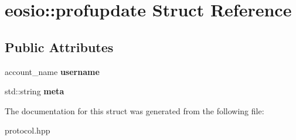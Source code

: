 \hypertarget{structeosio_1_1profupdate}{}\section{eosio\+:\+:profupdate Struct Reference}
\label{structeosio_1_1profupdate}
\subsection*{Public Attributes}
\begin{DoxyCompactItemize}
\item 
\mbox{\label{structeosio_1_1profupdate_a0fcb866e1dd8e75c866fd5ae4129f388}} 
account\+\_\+name {\bfseries username}
\item 
\mbox{\label{structeosio_1_1profupdate_a40c0bd468bb6f7bba5bea61266a1d7f0}} 
std\+::string {\bfseries meta}
\end{DoxyCompactItemize}


The documentation for this struct was generated from the following file\+:\begin{DoxyCompactItemize}
\item 
protocol.\+hpp\end{DoxyCompactItemize}

